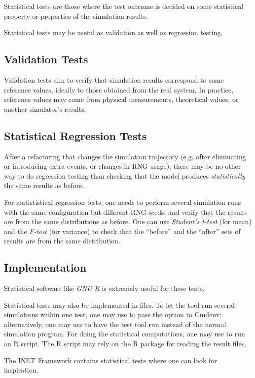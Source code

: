 Statistical tests are those where the test outcome is decided on
some statistical property or properties of the simulation results.

Statistical tests may be useful as validation as well as regression testing.

\subsection{Validation Tests}
\label{sec:testing:validation-tests}

Validation tests aim to verify that simulation results correspond to some
reference values, ideally to those obtained from the real system. In
practice, reference values may come from physical measurements, theoretical
values, or another simulator's results.

\subsection{Statistical Regression Tests}
\label{sec:testing:statistical-regression-tests}

After a refactoring that changes the simulation trajectory (e.g. after
eliminating or introducing extra events, or changes in RNG usage), there
may be no other way to do regression testing than checking that the model
produces \textit{statistically} the same results as before.

For statististical regression tests, one needs to perform several
simulation runs with the same configuration but different RNG seeds, and
verify that the results are from the same distributions as before. One can
use \textit{Student's t-test} (for mean) and the \textit{F-test} (for
variance) to check that the ``before'' and the ``after'' sets of results
are from the same distribution.

\subsection{Implementation}
\label{sec:testing:statistical-tests-implementation}

Statistical software like \textit{GNU R} is extremely useful for these
tests.

Statistical tests may also be implemented in  files. To let the
tool run several simulations within one test, one may use
 to pass the  option to Cmdenv;
alternatively, one may use  to have the test tool run
 instead of the normal simulation program. For doing the
statistical computations, one may use  to run an R
script. The R script may rely on the  R package for reading
the result files.

The INET Framework contains statistical tests where one can look for
inspiration.




